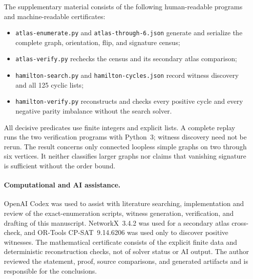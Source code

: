 \documentclass[11pt]{article}
\begin{document}
The supplementary material consists of the following human-readable programs
and machine-readable certificates:
\begin{itemize}
  \item \texttt{atlas-enumerate.py} and \texttt{atlas-through-6.json} generate
        and serialize the complete graph, orientation, flip, and signature
        census;
  \item \texttt{atlas-verify.py} rechecks the census and its secondary atlas
        comparison;
  \item \texttt{hamilton-search.py} and \texttt{hamilton-cycles.json} record
        witness discovery and all 125 cyclic lists;
  \item \texttt{hamilton-verify.py} reconstructs and checks every positive
        cycle and every negative parity imbalance without the search solver.
\end{itemize}
All decisive predicates use finite integers and explicit lists.  A complete
replay runs the two verification programs with Python~3; witness discovery
need not be rerun.  The result concerns only connected loopless simple graphs
on two through six vertices.  It neither classifies larger graphs nor claims
that vanishing signature is sufficient without the order bound.

\paragraph{Computational and AI assistance.}
OpenAI Codex was used to assist with literature searching, implementation and
review of the exact-enumeration scripts, witness generation, verification, and
drafting of this manuscript.  NetworkX~3.4.2 was used for a secondary atlas
cross-check, and OR-Tools CP-SAT~9.14.6206 was used only to discover positive
witnesses.  The mathematical certificate consists of the explicit finite data
and deterministic reconstruction checks, not of solver status or AI output.
The author reviewed the statement, proof, source comparisons, and generated
artifacts and is responsible for the conclusions.



\end{document}

